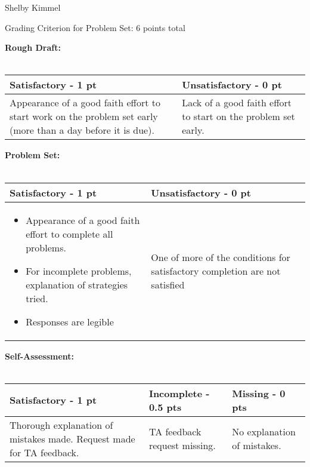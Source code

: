 \documentclass[12pt,landscape]{article}
\begin{document}
\hfill Shelby Kimmel

\begin{center}
{\huge Grading Criterion for Problem Set: 6 points total}
\end{center}
\bigskip

{\large \textbf{Rough Draft:}}\\~\\
{\renewcommand{\arraystretch}{2}
\begin{tabular}{|p{13cm}|p{7cm}|}
\hline
{\bf Satisfactory - 1 pt}& {\bf Unsatisfactory - 0 pt}\\
\hline

Appearance of a good faith effort to start work on the problem set early (more than a day before it is due).

  & Lack of a good faith effort to start on the problem set early.\\
  \hline
\end{tabular}}
\bigskip
\bigskip

{\large \textbf{Problem Set:}}\\~\\
{\renewcommand{\arraystretch}{2}
\begin{tabular}{|p{13cm}|p{7cm}|}
\hline
{\bf Satisfactory - 1 pt}& {\bf Unsatisfactory - 0 pt}\\
\hline
\begin{itemize}
\item Appearance of a good faith effort to complete all problems.
\item For incomplete problems, explanation of strategies tried.
\item Responses are legible
\end{itemize}
  & One of more of the conditions for satisfactory completion are not satisfied\\
  \hline
\end{tabular}}

\newpage
{\large \textbf{ Self-Assessment:}}\\~\\
{\renewcommand{\arraystretch}{2}
\begin{tabular}{|p{7cm}|p{7cm}|p{7cm}|}
\hline
{\bf Satisfactory - 1 pt}& {\bf Incomplete - 0.5 pts} & {\bf Missing - 0 pts}\\
\hline
Thorough explanation of mistakes made. Request made for TA feedback.
  & TA feedback request missing.
  & No explanation of mistakes.\\
  \hline
\end{tabular}}
\end{document}

